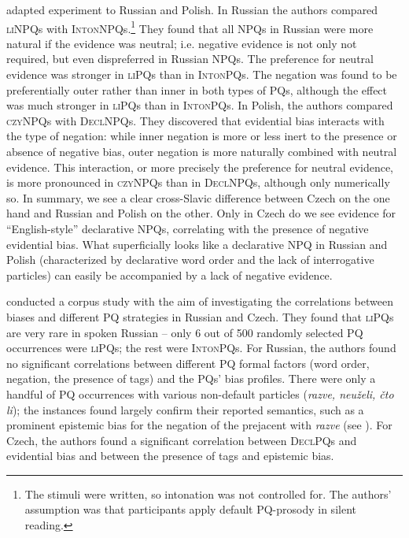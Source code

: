 \documentclass[output=paper,colorlinks,citecolor=brown]{langscibook}
\begin{document}
\citet{Chirpanlieva.etal2025} adapted  experiment to Russian and Polish. In Russian the authors compared \textsc{liNPQ}s with \textsc{IntonNPQ}s.\footnote{The stimuli were written, so intonation was not controlled for. The authors' assumption was that participants apply default PQ-prosody in silent reading.} They found that all NPQs in Russian were more natural if the evidence was neutral; i.e. negative evidence is not only not required, but even dispreferred in Russian NPQs. The preference for neutral evidence was stronger in \textsc{liPQ}s than in \textsc{IntonPQ}s. The negation was found to be preferentially outer rather than inner in both types of PQs, although the effect was much stronger in \textsc{liPQ}s than in \textsc{IntonPQ}s. In Polish, the authors compared \textsc{czyNPQ}s with \textsc{DeclNPQ}s. They discovered that evidential bias interacts with the type of negation: while inner negation is more or less inert to the presence or absence of negative bias, outer negation is more naturally combined with neutral evidence. This interaction, or more precisely the preference for neutral evidence, is more pronounced in \textsc{czyNPQ}s than in \textsc{DeclNPQ}s, although only numerically so. In summary, we see a clear cross-Slavic difference between Czech on the one hand and Russian and Polish on the other. Only in Czech do we see evidence for ``English-style'' declarative NPQs, correlating with the presence of negative evidential bias. What superficially looks like a declarative NPQ in Russian and Polish (characterized by declarative word order and the lack of interrogative particles) can easily be accompanied by a lack of negative evidence.

\citet{Onoeva.Stankova2025} conducted a corpus study with the aim of investigating the correlations between biases and different PQ strategies in Russian and Czech. They found that \textsc{liPQ}s are very rare in spoken Russian -- only 6 out of 500 randomly selected PQ occurrences were \textsc{liPQ}s; the rest were \textsc{IntonPQ}s. For Russian, the authors found no significant correlations between different PQ formal factors (word order, negation, the presence of tags) and the PQs' bias profiles. There were only a handful of PQ occurrences with various non-default particles (\textit{razve, neuželi, čto li}); the instances found largely confirm their reported semantics, such as a prominent epistemic bias for the negation of the prejacent with \textit{razve} (see ). For Czech, the authors found a significant correlation between \textsc{DeclPQ}s and evidential bias and between the presence of tags and epistemic bias.
\end{document}
